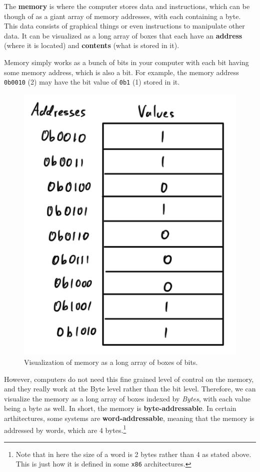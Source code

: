\documentclass{article}
\begin{document}
    \begin{definition}[Memory]
      The \textbf{memory} is where the computer stores data and instructions, which can be though of as a giant array of memory addresses, with each containing a byte. This data consists of graphical things or even instructions to manipulate other data. It can be visualized  as a long array of boxes that each have an \textbf{address} (where it is located) and \textbf{contents} (what is stored in it).

      Memory simply works as a bunch of bits in your computer with each bit having some memory address, which is also a bit. For example, the memory address \texttt{0b0010} (2) may have the bit value of \texttt{0b1} (1) stored in it. 

      \begin{figure}[H]
        \centering 
        \includegraphics[scale=0.4]{img/memory_visual_bit.png}
        \caption{Visualization of memory as a long array of boxes of bits. }
        \label{fig:memory_visual_bit}
      \end{figure}

      However, computers do not need this fine grained level of control on the memory, and they really work at the Byte level rather than the bit level. Therefore, we can visualize the memory as a long array of boxes indexed by \textit{Bytes}, with each value being a byte as well. In short, the memory is \textbf{byte-addressable}. In certain arthitectures, some systems are \textbf{word-addressable}, meaning that the memory is addressed by words, which are 4 bytes.\footnote{Note that in here the size of a word is 2 bytes rather than 4 as stated above. This is just how it is defined in some \texttt{x86} architectures.}


\end{definition}
\end{document}
